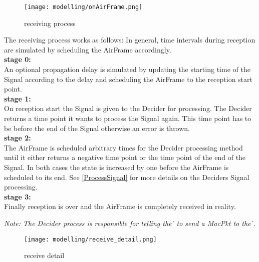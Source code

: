 \begin{figure}[H]
 \centering
 \texttt{[image: modelling/onAirFrame.png]}
 \caption{receiving process}
 \label{fig: receiving process}
\end{figure}


The receiving process works as follows: In general, time intervals during
reception are simulated by scheduling the AirFrame accordingly.\\

\textbf{stage 0:}\\
An optional propagation delay is simulated by updating the starting time of the
Signal according to the delay and scheduling the AirFrame to
the reception start point.\\

\textbf{stage 1:}\\
On reception start the Signal is given to the Decider for processing. The
Decider returns a time point it wants to process the Signal again.
This time point has to be before the end of the Signal otherwise an error
is thrown. \\

\textbf{stage 2:}\\
The AirFrame is scheduled arbitrary times for the Decider processing method
until it either returns a negative time point or the time point of the end of
the
Signal. In both cases the state is increased by one before the AirFrame is
scheduled to its end. See \ref{ProcessSignal} for more details on the Deciders
Signal processing. \\

\textbf{stage 3:}\\
Finally reception is over and the AirFrame is completely received in reality.

\emph{Note: The Decider process is responsible for telling the \h{\bp} to send
a MacPkt to the \h{\bm}.}

\begin{figure}[H]
 \centering
 \texttt{[image: modelling/receive\_detail.png]}
 \caption{receive detail}
 \label{fig: receive detail}
\end{figure}






